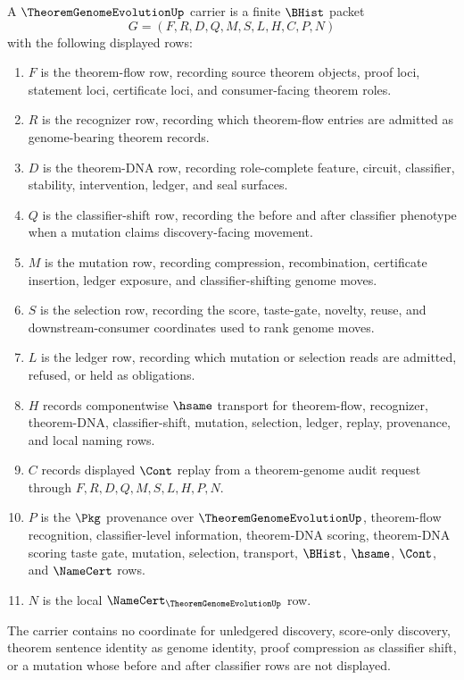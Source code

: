 \begin{definition}
\label{def:theorem-genome-evolution-carrier}
A $\TheoremGenomeEvolutionUp$ carrier is a finite $\BHist$ packet
$$
G=(F,R,D,Q,M,S,L,H,C,P,N)
$$
with the following displayed rows:
\begin{enumerate}
\item $F$ is the theorem-flow row, recording source theorem objects, proof loci, statement loci, certificate loci, and consumer-facing theorem roles.
\item $R$ is the recognizer row, recording which theorem-flow entries are admitted as genome-bearing theorem records.
\item $D$ is the theorem-DNA row, recording role-complete feature, circuit, classifier, stability, intervention, ledger, and seal surfaces.
\item $Q$ is the classifier-shift row, recording the before and after classifier phenotype when a mutation claims discovery-facing movement.
\item $M$ is the mutation row, recording compression, recombination, certificate insertion, ledger exposure, and classifier-shifting genome moves.
\item $S$ is the selection row, recording the score, taste-gate, novelty, reuse, and downstream-consumer coordinates used to rank genome moves.
\item $L$ is the ledger row, recording which mutation or selection reads are admitted, refused, or held as obligations.
\item $H$ records componentwise $\hsame$ transport for theorem-flow, recognizer, theorem-DNA, classifier-shift, mutation, selection, ledger, replay, provenance, and local naming rows.
\item $C$ records displayed $\Cont$ replay from a theorem-genome audit request through $F,R,D,Q,M,S,L,H,P,N$.
\item $P$ is the $\Pkg$ provenance over $\TheoremGenomeEvolutionUp$, theorem-flow recognition, classifier-level information, theorem-DNA scoring, theorem-DNA scoring taste gate, mutation, selection, transport, $\BHist$, $\hsame$, $\Cont$, and $\NameCert$ rows.
\item $N$ is the local $\NameCert_{\TheoremGenomeEvolutionUp}$ row.
\end{enumerate}
The carrier contains no coordinate for unledgered discovery, score-only discovery, theorem sentence identity as genome identity, proof compression as classifier shift, or a mutation whose before and after classifier rows are not displayed.
\end{definition}

